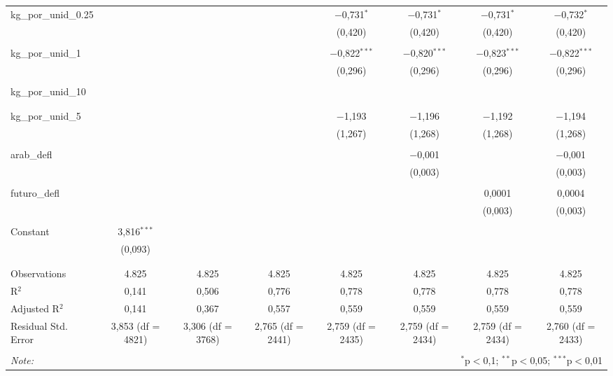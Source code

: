 \begin{table}[!htbp]
\begin{tabular}{@{\extracolsep{5pt}}lccccccc}
 kg\_por\_unid\_0.25 &  &  &  & $-$0,731$^{*}$ & $-$0,731$^{*}$ & $-$0,731$^{*}$ & $-$0,732$^{*}$ \\ 
  &  &  &  & (0,420) & (0,420) & (0,420) & (0,420) \\ 
  & & & & & & & \\ 
 kg\_por\_unid\_1 &  &  &  & $-$0,822$^{***}$ & $-$0,820$^{***}$ & $-$0,823$^{***}$ & $-$0,822$^{***}$ \\ 
  &  &  &  & (0,296) & (0,296) & (0,296) & (0,296) \\ 
  & & & & & & & \\ 
 kg\_por\_unid\_10 &  &  &  &  &  &  &  \\ 
  &  &  &  &  &  &  &  \\ 
  & & & & & & & \\ 
 kg\_por\_unid\_5 &  &  &  & $-$1,193 & $-$1,196 & $-$1,192 & $-$1,194 \\ 
  &  &  &  & (1,267) & (1,268) & (1,268) & (1,268) \\ 
  & & & & & & & \\ 
 arab\_defl &  &  &  &  & $-$0,001 &  & $-$0,001 \\ 
  &  &  &  &  & (0,003) &  & (0,003) \\ 
  & & & & & & & \\ 
 futuro\_defl &  &  &  &  &  & 0,0001 & 0,0004 \\ 
  &  &  &  &  &  & (0,003) & (0,003) \\ 
  & & & & & & & \\ 
 Constant & 3,816$^{***}$ &  &  &  &  &  &  \\ 
  & (0,093) &  &  &  &  &  &  \\ 
  & & & & & & & \\ 
\hline \\[-1.8ex] 
Observations & 4.825 & 4.825 & 4.825 & 4.825 & 4.825 & 4.825 & 4.825 \\ 
R$^{2}$ & 0,141 & 0,506 & 0,776 & 0,778 & 0,778 & 0,778 & 0,778 \\ 
Adjusted R$^{2}$ & 0,141 & 0,367 & 0,557 & 0,559 & 0,559 & 0,559 & 0,559 \\ 
Residual Std. Error & 3,853 (df = 4821) & 3,306 (df = 3768) & 2,765 (df = 2441) & 2,759 (df = 2435) & 2,759 (df = 2434) & 2,759 (df = 2434) & 2,760 (df = 2433) \\ 
\hline 
\hline \\[-1.8ex] 
\textit{Note:}  & \multicolumn{7}{r}{$^{*}$p$<$0,1; $^{**}$p$<$0,05; $^{***}$p$<$0,01} \\ 
\end{tabular} 
\end{table} 
